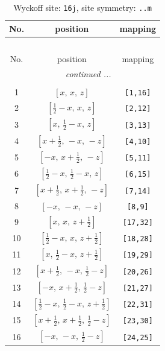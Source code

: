 \documentclass[fleqn,8pt]{jsarticle}
\begin{document}
\renewcommand{\arraystretch}{1.2}
\begin{longtable}{ccc}
\caption{Wyckoff site: {\tt 16j}, site symmetry: {\tt ..m}}
 \\
 \hline \hline
No. & position & mapping \\ \hline \endfirsthead

\multicolumn{2}{l}{\tablename\ \thetable{}} \\
 \hline \hline
No. & position & mapping \\ \hline \endhead

 \hline \hline
\multicolumn{2}{r}{\footnotesize\it continued ...} \\ \endfoot

 \hline \hline
\multicolumn{2}{r}{} \\ \endlastfoot

1 & $\left[ x,\, x,\, z \right]$ & {\tt [1,16]} \\ \hline
2 & $\left[ \frac{1}{2} - x,\, x,\, z \right]$ & {\tt [2,12]} \\ \hline
3 & $\left[ x,\, \frac{1}{2} - x,\, z \right]$ & {\tt [3,13]} \\ \hline
4 & $\left[ x + \frac{1}{2},\, - x,\, - z \right]$ & {\tt [4,10]} \\ \hline
5 & $\left[ - x,\, x + \frac{1}{2},\, - z \right]$ & {\tt [5,11]} \\ \hline
6 & $\left[ \frac{1}{2} - x,\, \frac{1}{2} - x,\, z \right]$ & {\tt [6,15]} \\ \hline
7 & $\left[ x + \frac{1}{2},\, x + \frac{1}{2},\, - z \right]$ & {\tt [7,14]} \\ \hline
8 & $\left[ - x,\, - x,\, - z \right]$ & {\tt [8,9]} \\ \hline
9 & $\left[ x,\, x,\, z + \frac{1}{2} \right]$ & {\tt [17,32]} \\ \hline
10 & $\left[ \frac{1}{2} - x,\, x,\, z + \frac{1}{2} \right]$ & {\tt [18,28]} \\ \hline
11 & $\left[ x,\, \frac{1}{2} - x,\, z + \frac{1}{2} \right]$ & {\tt [19,29]} \\ \hline
12 & $\left[ x + \frac{1}{2},\, - x,\, \frac{1}{2} - z \right]$ & {\tt [20,26]} \\ \hline
13 & $\left[ - x,\, x + \frac{1}{2},\, \frac{1}{2} - z \right]$ & {\tt [21,27]} \\ \hline
14 & $\left[ \frac{1}{2} - x,\, \frac{1}{2} - x,\, z + \frac{1}{2} \right]$ & {\tt [22,31]} \\ \hline
15 & $\left[ x + \frac{1}{2},\, x + \frac{1}{2},\, \frac{1}{2} - z \right]$ & {\tt [23,30]} \\ \hline
16 & $\left[ - x,\, - x,\, \frac{1}{2} - z \right]$ & {\tt [24,25]} \\
\end{longtable}
\end{document}
